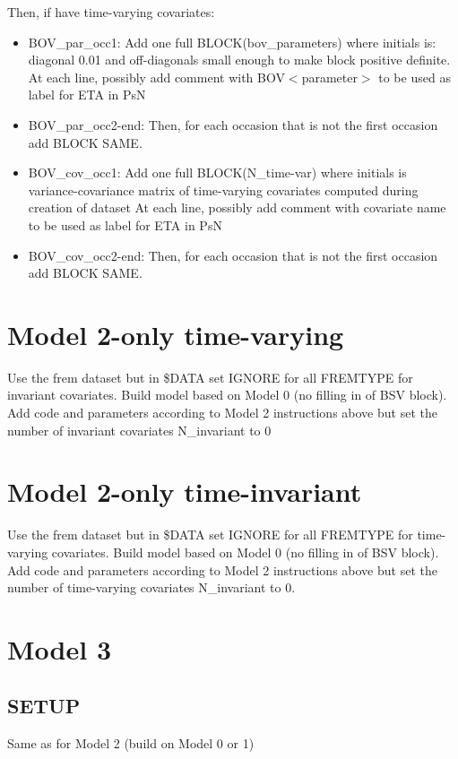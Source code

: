 Then, if have time-varying covariates:
\begin{itemize}
\item BOV\_par\_occ1: Add one full BLOCK(bov\_parameters) where initials is: diagonal 0.01 and off-diagonals small enough to make
block positive definite.
At each line, possibly add comment with BOV$<$parameter$>$ to be used as label for ETA in PsN
\item BOV\_par\_occ2-end: Then, for each occasion that is not the first occasion add BLOCK SAME.
\item BOV\_cov\_occ1: Add one full BLOCK(N\_time-var) where initials is variance-covariance matrix of time-varying covariates computed during creation of dataset
At each line, possibly add comment with covariate name to be used as label for ETA in PsN
\item BOV\_cov\_occ2-end: Then, for each occasion that is not the first occasion add BLOCK SAME.
\end{itemize}

\section{Model 2-only time-varying}
Use the frem dataset but in \$DATA set IGNORE for all FREMTYPE for invariant covariates. Build model based on Model 0 (no filling in of BSV block). Add code and parameters according to Model 2 instructions above but set the number of invariant covariates N\_invariant to 0

\section{Model 2-only time-invariant}
Use the frem dataset but in \$DATA set IGNORE for all FREMTYPE for time-varying covariates. Build model based on Model 0 (no filling in of BSV block). Add code and parameters according to Model 2 instructions above but set the number of time-varying covariates N\_invariant to 0.

\section{Model 3}
\subsection{SETUP}
Same as for Model 2 (build on Model 0 or 1)

